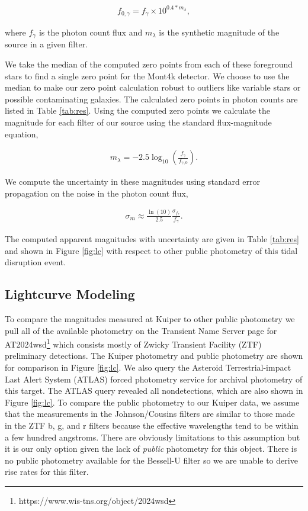 \documentclass{aastex631}
\begin{document}
\begin{align}
  f_{0,\gamma} = f_\gamma \times 10^{0.4 * m_\lambda},\label{eq:f0}
\end{align}

\noindent where $f_\gamma$ is the photon count flux and $m_\lambda$ is the synthetic magnitude of the source in a given filter.

We take the median of the computed zero points from each of these foreground stars to find a single zero point for the Mont4k detector. We choose to use the median to make our zero point calculation robust to outliers like variable stars or possible contaminating galaxies. The calculated zero points in photon counts are listed in Table \ref{tab:res}. Using the computed zero points we calculate the magnitude for each filter of our source using the standard flux-magnitude equation,

\begin{align}
  m_\lambda = -2.5\log_{10}\left(\frac{f_\gamma}{f_{\gamma,0}}\right).
\end{align}

\noindent We compute the uncertainty in these magnitudes using standard error propagation on the noise in the photon count flux,

\begin{align}
  \sigma_m \approx \frac{\ln(10)}{2.5} \frac{\sigma_{f_\gamma}}{f_\gamma} .
\end{align}

\noindent The computed apparent magnitudes with uncertainty are given in Table \ref{tab:res} and shown in Figure \ref{fig:lc} with respect to other public photometry of this tidal disruption event.

\subsection{Lightcurve Modeling}
To compare the magnitudes measured at Kuiper to other public photometry we pull all of the available photometry on the Transient Name Server page for AT2024wsd\footnote{https://www.wis-tns.org/object/2024wsd} which consists mostly of Zwicky Transient Facility (ZTF) preliminary detections. The Kuiper photometry and public photometry are shown for comparison in Figure \ref{fig:lc}. We also query the Asteroid Terrestrial-impact Last Alert System (ATLAS) forced photometry service for archival photometry of this target. The ATLAS query revealed all nondetections, which are also shown in Figure \ref{fig:lc}. To compare the public photometry to our Kuiper data, we assume that the measurements in the Johnson/Cousins filters are similar to those made in the ZTF b, g, and r filters because the effective wavelengths tend to be within a few hundred angstroms. There are obviously limitations to this assumption but it is our only option given the lack of {\it public} photometry for this object. There is no public photometry available for the Bessell-U filter so we are unable to derive rise rates for this filter.
\end{document}
